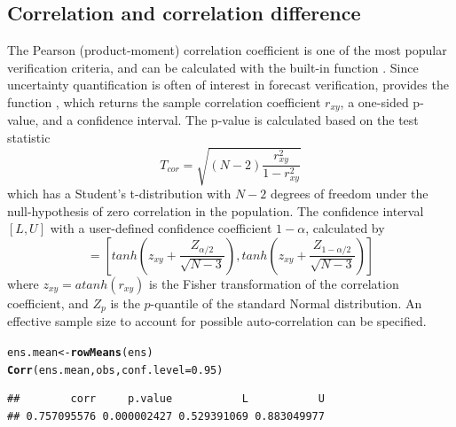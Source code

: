 \documentclass[article]{jss}\usepackage{graphicx, color}
\makeatletter
\newcommand{\hlfunctioncall}[1]{\textcolor[rgb]{0,0.501960784313725,0.752941176470588}{\textbf{#1}}}%
\newenvironment{kframe}{%
 \def\at@end@of@kframe{}%
 \ifinner\ifhmode%
  \def\at@end@of@kframe{\end{minipage}}%
  \begin{minipage}{\columnwidth}%
 \fi\fi%
 \def\FrameCommand##1{\hskip\@totalleftmargin \hskip-\fboxsep
 \colorbox{shadecolor}{##1}\hskip-\fboxsep
     \hskip-\linewidth \hskip-\@totalleftmargin \hskip\columnwidth}%
 \MakeFramed {\advance\hsize-\width
   \@totalleftmargin\z@ \linewidth\hsize
   \@setminipage}}%
 {\par\unskip\endMakeFramed%
 \at@end@of@kframe}
\newenvironment{knitrout}{}{} %
\makeatother
\begin{document}
\subsection{Correlation and correlation difference}

The Pearson (product-moment) correlation coefficient is one of the most popular verification criteria, and can be calculated with the built-in  function .
Since uncertainty quantification is often of interest in forecast verification,  provides the function , which returns the sample correlation coefficient $r_{xy}$, a one-sided p-value, and a confidence interval.
The p-value is calculated based on the test statistic
%
\begin{equation}
T_{cor} = \sqrt{(N-2) \frac{r_{xy}^2}{1 - r_{xy}^2}}
\end{equation}
%
which has a Student's t-distribution with $N-2$ degrees of freedom under the null-hypothesis of zero correlation in the population. 
The confidence interval $[L,U]$ with a user-defined confidence coefficient $1-\alpha$, calculated by
%
\begin{equation}
[L, U] = \left[ tanh\left(z_{xy} + \frac{Z_{\alpha/2}}{\sqrt{N-3}}\right), tanh\left(z_{xy} + \frac{Z_{1-\alpha/2}}{\sqrt{N-3}}\right)\right]\label{eq:fisherCi}
\end{equation} 
%
where $z_{xy} = atanh(r_{xy})$ is the Fisher transformation of the correlation coefficient, and $Z_p$ is the $p$-quantile of the standard Normal distribution.
An effective sample size to account for possible auto-correlation can be specified.
%
\begin{knitrout}
\color{fgcolor}\begin{kframe}
\begin{alltt}
ens.mean <- \hlfunctioncall{rowMeans}(ens)
\hlfunctioncall{Corr}(ens.mean, obs, conf.level=0.95)
\end{alltt}
\begin{verbatim}
##        corr     p.value           L           U 
## 0.757095576 0.000002427 0.529391069 0.883049977
\end{verbatim}
\end{kframe}
\end{knitrout}
\end{document}
